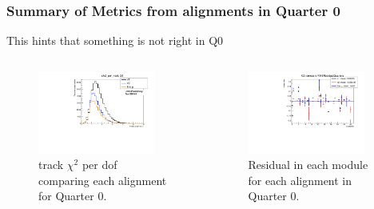 \documentclass[aspectratio=1610, 12pt]{beamer}
\begin{document}
\begin{frame}\frametitle{Summary of Metrics from alignments in Quarter 0}
  This hints that something is not right in Q0
  \begin{columns}
    \begin{column}[c]{0.48\textwidth}
      \begin{figure}
        \centering
        \includegraphics[width=0.9\textwidth]{2023-mar-9-DPG/chi2_per_ndof_Q0.pdf}
        \caption{track $\chi^2$ per dof comparing each alignment for Quarter 0.}
      \end{figure}
    \end{column}
    \begin{column}{0.48\textwidth}
      \begin{figure}
        \includegraphics[width=0.9\textwidth]{2023-mar-9-DPG/RMSResidualQuarters_Q0.pdf}
        \caption{Residual in each module for each alignment in Quarter 0.}
      \end{figure}
    \end{column}
  \end{columns}
\end{frame}
\end{document}

